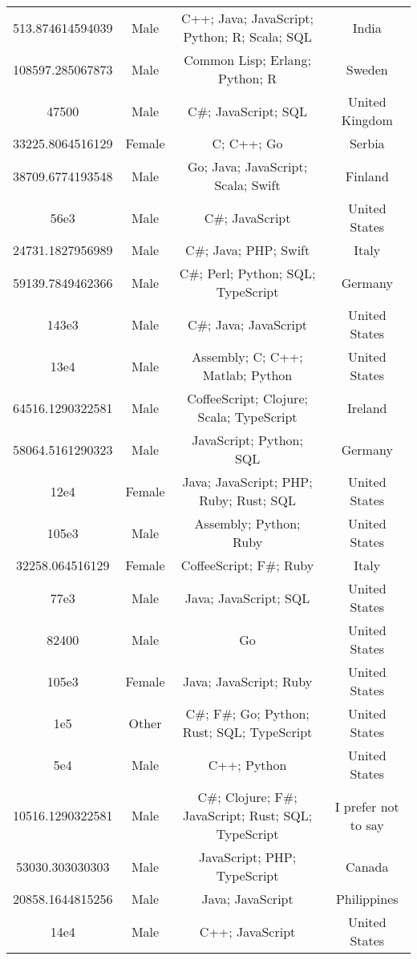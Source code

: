 \begin{center}
\begin{tabular}{ |c|c|c|c| }
513.874614594039  &  Male  &  C++; Java; JavaScript; Python; R; Scala; SQL  &  India  \\ 
108597.285067873  &  Male  &  Common Lisp; Erlang; Python; R  &  Sweden  \\ 
47500  &  Male  &  C\#; JavaScript; SQL  &  United Kingdom  \\ 
33225.8064516129  &  Female  &  C; C++; Go  &  Serbia  \\ 
38709.6774193548  &  Male  &  Go; Java; JavaScript; Scala; Swift  &  Finland  \\ 
56e3  &  Male  &  C\#; JavaScript  &  United States  \\ 
24731.1827956989  &  Male  &  C\#; Java; PHP; Swift  &  Italy  \\ 
59139.7849462366  &  Male  &  C\#; Perl; Python; SQL; TypeScript  &  Germany  \\ 
143e3  &  Male  &  C\#; Java; JavaScript  &  United States  \\ 
13e4  &  Male  &  Assembly; C; C++; Matlab; Python  &  United States  \\ 
64516.1290322581  &  Male  &  CoffeeScript; Clojure; Scala; TypeScript  &  Ireland  \\ 
58064.5161290323  &  Male  &  JavaScript; Python; SQL  &  Germany  \\ 
12e4  &  Female  &  Java; JavaScript; PHP; Ruby; Rust; SQL  &  United States  \\ 
105e3  &  Male  &  Assembly; Python; Ruby  &  United States  \\ 
32258.064516129  &  Female  &  CoffeeScript; F\#; Ruby  &  Italy  \\ 
77e3  &  Male  &  Java; JavaScript; SQL  &  United States  \\ 
82400  &  Male  &  Go  &  United States  \\ 
105e3  &  Female  &  Java; JavaScript; Ruby  &  United States  \\ 
1e5  &  Other  &  C\#; F\#; Go; Python; Rust; SQL; TypeScript  &  United States  \\ 
5e4  &  Male  &  C++; Python  &  United States  \\ 
10516.1290322581  &  Male  &  C\#; Clojure; F\#; JavaScript; Rust; SQL; TypeScript  &  I prefer not to say  \\ 
53030.303030303  &  Male  &  JavaScript; PHP; TypeScript  &  Canada  \\ 
20858.1644815256  &  Male  &  Java; JavaScript  &  Philippines  \\ 
14e4  &  Male  &  C++; JavaScript  &  United States  \\ 

\end{tabular}
\end{center}
